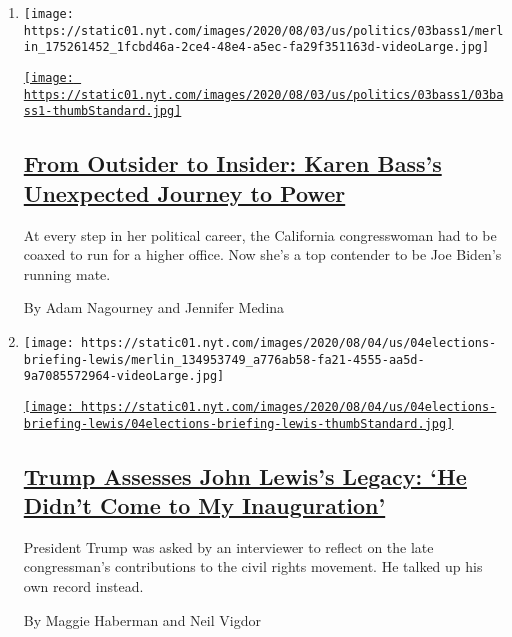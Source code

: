 \begin{enumerate}
\def\labelenumi{\arabic{enumi}.}
\item
  \texttt{[image: https://static01.nyt.com/images/2020/08/03/us/politics/03bass1/merlin\_175261452\_1fcbd46a-2ce4-48e4-a5ec-fa29f351163d-videoLarge.jpg]}

  \href{/2020/08/04/us/politics/karen-bass-vice-president-biden.html}{\texttt{[image: https://static01.nyt.com/images/2020/08/03/us/politics/03bass1/03bass1-thumbStandard.jpg]}}

  \hypertarget{from-outsider-to-insider-karen-basss-unexpected-journey-to-power}{%
  \subsection{\texorpdfstring{\href{/2020/08/04/us/politics/karen-bass-vice-president-biden.html}{From
  Outsider to Insider: Karen Bass's Unexpected Journey to
  Power}}{From Outsider to Insider: Karen Bass's Unexpected Journey to Power}}\label{from-outsider-to-insider-karen-basss-unexpected-journey-to-power}}

  At every step in her political career, the California congresswoman
  had to be coaxed to run for a higher office. Now she's a top contender
  to be Joe Biden's running mate.

  By Adam Nagourney and Jennifer Medina
\item
  \texttt{[image: https://static01.nyt.com/images/2020/08/04/us/04elections-briefing-lewis/merlin\_134953749\_a776ab58-fa21-4555-aa5d-9a7085572964-videoLarge.jpg]}

  \href{/2020/08/04/us/politics/trump-john-lewis-axios.html}{\texttt{[image: https://static01.nyt.com/images/2020/08/04/us/04elections-briefing-lewis/04elections-briefing-lewis-thumbStandard.jpg]}}

  \hypertarget{trump-assesses-john-lewiss-legacy-he-didnt-come-to-my-inauguration}{%
  \subsection{\texorpdfstring{\href{/2020/08/04/us/politics/trump-john-lewis-axios.html}{Trump
  Assesses John Lewis's Legacy: `He Didn't Come to My
  Inauguration'}}{Trump Assesses John Lewis's Legacy: `He Didn't Come to My Inauguration'}}\label{trump-assesses-john-lewiss-legacy-he-didnt-come-to-my-inauguration}}

  President Trump was asked by an interviewer to reflect on the late
  congressman's contributions to the civil rights movement. He talked up
  his own record instead.

  By Maggie Haberman and Neil Vigdor
\end{enumerate}

